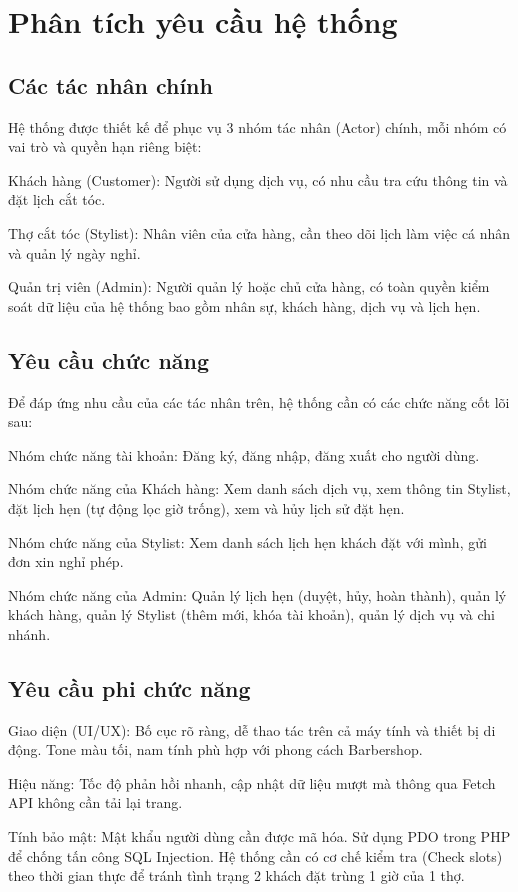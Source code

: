 \documentclass[../BTL.tex]{subfiles}
\begin{document}
\section{Phân tích yêu cầu hệ thống}
\subsection{Các tác nhân chính}
Hệ thống được thiết kế để phục vụ 3 nhóm tác nhân (Actor) chính, mỗi
nhóm có vai trò và quyền hạn riêng biệt:

Khách hàng (Customer): Người sử dụng dịch vụ, có nhu cầu tra cứu thông
tin và đặt lịch cắt tóc.

Thợ cắt tóc (Stylist): Nhân viên của cửa hàng, cần theo dõi lịch làm
việc cá nhân và quản lý ngày nghỉ.

Quản trị viên (Admin): Người quản lý hoặc chủ cửa hàng, có toàn quyền
kiểm soát dữ liệu của hệ thống bao gồm nhân sự, khách hàng, dịch vụ và
lịch hẹn.

\subsection{Yêu cầu chức năng}
Để đáp ứng nhu cầu của các tác nhân trên, hệ thống cần có các chức năng
cốt lõi sau:

Nhóm chức năng tài khoản: Đăng ký, đăng nhập, đăng xuất cho người dùng.

Nhóm chức năng của Khách hàng: Xem danh sách dịch vụ, xem thông tin
Stylist, đặt lịch hẹn (tự động lọc giờ trống), xem và hủy lịch sử đặt
hẹn.

Nhóm chức năng của Stylist: Xem danh sách lịch hẹn khách đặt với mình,
gửi đơn xin nghỉ phép.

Nhóm chức năng của Admin: Quản lý lịch hẹn (duyệt, hủy, hoàn thành),
quản lý khách hàng, quản lý Stylist (thêm mới, khóa tài khoản), quản lý
dịch vụ và chi nhánh.

\subsection{Yêu cầu phi chức năng}
Giao diện (UI/UX): Bố cục rõ ràng, dễ thao tác trên cả máy tính và thiết
bị di động. Tone màu tối, nam tính phù hợp với phong cách Barbershop.

Hiệu năng: Tốc độ phản hồi nhanh, cập nhật dữ liệu mượt mà thông qua
Fetch API không cần tải lại trang.

Tính bảo mật: Mật khẩu người dùng cần được mã hóa. Sử dụng PDO trong PHP
để chống tấn công SQL Injection. Hệ thống cần có cơ chế kiểm tra (Check
slots) theo thời gian thực để tránh tình trạng 2 khách đặt trùng 1 giờ
của 1 thợ.
\end{document}
